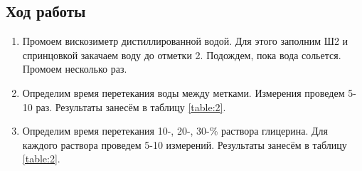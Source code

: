 \documentclass[a4paper,12pt]{article}
\numberwithin{equation}{section}
\begin{document}
\subsection{Ход работы}
\begin{enumerate}
  \item Промоем вискозиметр дистиллированной водой. Для этого заполним Ш2 и спринцовкой закачаем воду до отметки 2. Подождем, пока вода сольется. Промоем несколько раз.

  \item Определим время перетекания воды между метками. Измерения проведем 5-10 раз. Результаты занесём в таблицу \ref{table:2}.

  \item Определим время перетекания 10-, 20-, 30-\% раствора глицерина. Для каждого раствора проведем 5-10 измерений. Результаты занесём в таблицу \ref{table:2}.


\end{enumerate}
\end{document}
